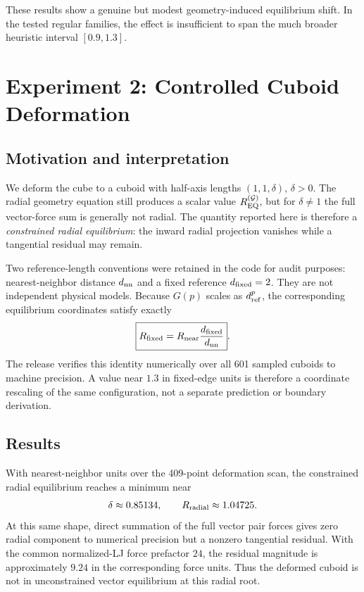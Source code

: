 \documentclass[11pt]{article}
\begin{document}
These results show a genuine but modest geometry-induced equilibrium shift. In the tested regular families, the effect is insufficient to span the much broader heuristic interval $[0.9,1.3]$.

\section{Experiment 2: Controlled Cuboid Deformation}
\subsection{Motivation and interpretation}
We deform the cube to a cuboid with half-axis lengths $(1,1,\delta)$, $\delta>0$. The radial geometry equation still produces a scalar value $R_{\rm EQ}^{(\mathcal G)}$, but for $\delta\ne1$ the full vector-force sum is generally not radial. The quantity reported here is therefore a \emph{constrained radial equilibrium}: the inward radial projection vanishes while a tangential residual may remain.

Two reference-length conventions were retained in the code for audit purposes: nearest-neighbor distance $d_{\rm nn}$ and a fixed reference $d_{\rm fixed}=2$. They are not independent physical models. Because $G(p)$ scales as $d_{\rm ref}^{p}$, the corresponding equilibrium coordinates satisfy exactly
\begin{equation}
\boxed{R_{\rm fixed}=R_{\rm near}\frac{d_{\rm fixed}}{d_{\rm nn}}}.
\end{equation}
The release verifies this identity numerically over all 601 sampled cuboids to machine precision. A value near $1.3$ in fixed-edge units is therefore a coordinate rescaling of the same configuration, not a separate prediction or boundary derivation.

\subsection{Results}
With nearest-neighbor units over the 409-point deformation scan, the constrained radial equilibrium reaches a minimum near
\begin{equation}
\delta\approx0.85134,\qquad R_{\rm radial}\approx1.04725.
\end{equation}
At this same shape, direct summation of the full vector pair forces gives zero radial component to numerical precision but a nonzero tangential residual. With the common normalized-LJ force prefactor $24$, the residual magnitude is approximately $9.24$ in the corresponding force units. Thus the deformed cuboid is not in unconstrained vector equilibrium at this radial root.
\end{document}
